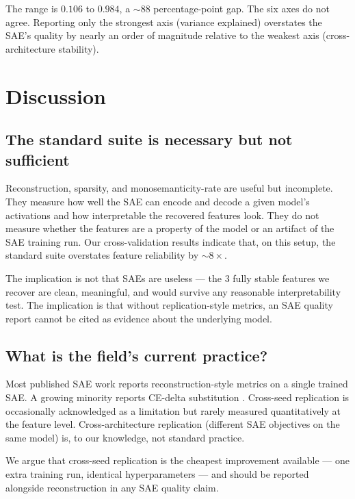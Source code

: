 \documentclass[11pt]{article}
\begin{document}
The range is $0.106$ to $0.984$, a $\sim 88$ percentage-point gap. The
six axes do not agree. Reporting only the strongest axis (variance
explained) overstates the SAE's quality by nearly an order of magnitude
relative to the weakest axis (cross-architecture stability).

\section{Discussion}

\subsection{The standard suite is necessary but not sufficient}

Reconstruction, sparsity, and monosemanticity-rate are useful but
incomplete. They measure how well the SAE can encode and decode a given
model's activations and how interpretable the recovered features look.
They do not measure whether the features are a property of the model or
an artifact of the SAE training run. Our cross-validation results
indicate that, on this setup, the standard suite overstates feature
reliability by $\sim 8\times$.

The implication is not that SAEs are useless --- the $3$ fully stable
features we recover are clean, meaningful, and would survive any
reasonable interpretability test. The implication is that without
replication-style metrics, an SAE quality report cannot be cited as
evidence about the underlying model.

\subsection{What is the field's current practice?}

Most published SAE work reports reconstruction-style metrics on a single
trained SAE. A growing minority reports CE-delta substitution
\cite{lieberum2024gemma}. Cross-seed replication is occasionally
acknowledged as a limitation \cite{templeton2024scaling,
rajamanoharan2024gated} but rarely measured quantitatively at the
feature level. Cross-architecture replication (different SAE objectives
on the same model) is, to our knowledge, not standard practice.

We argue that cross-seed replication is the cheapest improvement
available --- one extra training run, identical hyperparameters --- and
should be reported alongside reconstruction in any SAE quality claim.
\end{document}
